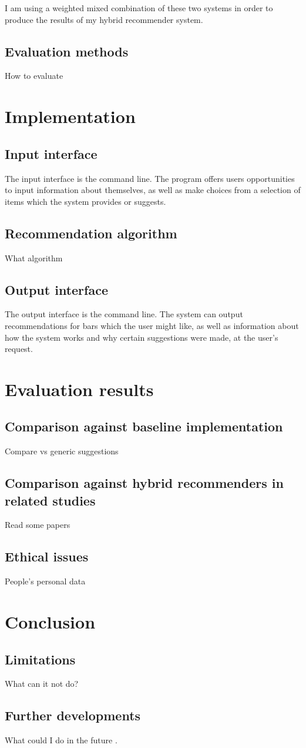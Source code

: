 \documentclass[conference]{IEEEtran}
\begin{document}
I am using a weighted mixed combination of these two systems in order to produce the results
of my hybrid recommender system.

\subsection{Evaluation methods}
How to evaluate


\section{Implementation}

\subsection{Input interface}
The input interface is the command line.
The program offers users opportunities to input information about themselves,
as well as make choices from a selection of items which the system provides or suggests.

\subsection{Recommendation algorithm}
What algorithm

\subsection{Output interface}
The output interface is the command line.
The system can output recommendations for bars which the user might like,
as well as information about how the system works and why certain suggestions were made,
at the user's request.


\section{Evaluation results}

\subsection{Comparison against baseline implementation}
Compare vs generic suggestions

\subsection{Comparison against hybrid recommenders in related studies}
Read some papers

\subsection{Ethical issues}
People's personal data


\section{Conclusion}

\subsection{Limitations}
What can it not do?

\subsection{Further developments}
What could I do in the future \cite{5284958}. 




\end{document}
